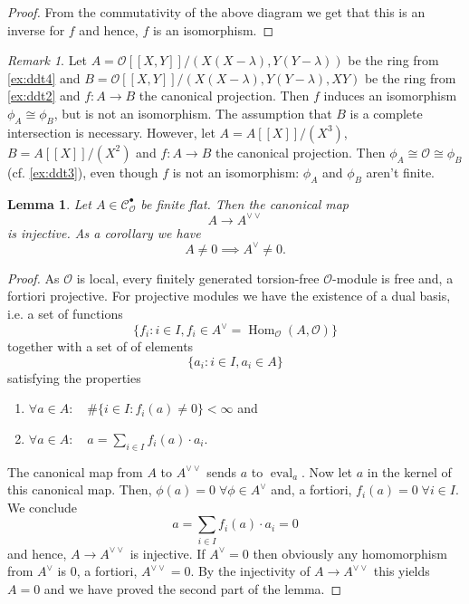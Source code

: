 \documentclass{article}
\theoremstyle{plain}%
\newtheorem{lemma}[theorem]{Lemma}
\theoremstyle{definition}
\theoremstyle{remark}
\newtheorem{remark}[theorem]{Remark}
\newcommand{\cob}{\mathcal{C}_\mathcal{O}^\bullet}
\renewcommand{\hom}{\operatorname{Hom}}
\begin{document}
\begin{proof}
    From the commutativity of the above diagram we get that this is an inverse for \(f\) and
    hence, \(f\) is an isomorphism.
\end{proof}

\begin{remark}\cite[remark 5.22, remark 5.23]{Darmon1995}
    Let \(A = \mathcal{O}[[X,Y]]/(X(X-\lambda), Y(Y-\lambda))\) be the ring from \cref{ex:ddt4} and 
    \(B = \mathcal{O}[[X,Y]]/(X(X-\lambda), Y(Y-\lambda), XY)\) be the ring from \cref{ex:ddt2} and 
    \(f\colon A \to B\) the canonical projection. Then \(f\) induces an isomorphism \(\phi_A \cong \phi_B\),
    but is not an isomorphism. The assumption that \(B\) is a complete intersection is necessary.
    However, let \(A = A[[X]]/(X^3)\), \(B = A[[X]]/(X^2)\) and \(f \colon A \to B\) the canonical projection.
    Then \(\phi_A \cong \mathcal{O} \cong \phi_B\) (cf. \cref{ex:ddt3}), even though \(f\) is not an isomorphism:
    \(\phi_A\) and \(\phi_B\) aren't finite.
\end{remark}

\begin{lemma}\label{lem:pontryagininjectivity}
    Let \(A \in \cob\) be finite flat. Then the canonical map
    \[
        A \to A^{\vee\vee}
    \]
    is injective. As a corollary we have
    \[
        A \neq 0 \implies A^\vee \neq 0.  
    \]
\end{lemma}
\begin{proof}
    As \(\mathcal{O}\) is local, every finitely generated torsion-free \(\mathcal{O}\)-module is free and, 
    a fortiori projective. For projective modules we have the existence of a dual basis, i.e. a set of functions
    \[
        \{f_i \colon i \in I, f_i \in A^\vee = \hom_\mathcal{O}(A, \mathcal{O})\}  
    \]
    together with a set of of elements
    \[
        \{a_i \colon i \in I, a_i \in A\}  
    \]
    satisfying the properties
    \begin{enumerate}
        \item \(\forall a \in A\colon \quad \# \{i\in I\colon f_i(a) \neq 0\} < \infty\) and
        \item \(\forall a \in A\colon \quad a = \sum_{i \in I} f_i(a)\cdot a_i\).
    \end{enumerate}
    The canonical map from \(A\) to \(A^{\vee\vee}\) sends \(a\) to \(\operatorname{eval}_a\).
    Now let \(a\) in the kernel of this canonical map. Then, \(\phi(a) = 0\; \forall \phi \in A^\vee\)
    and, a fortiori, \(f_i(a) = 0\; \forall i \in I\).
    We conclude
    \[
        a = \sum_{i \in I} f_i(a)\cdot a_i = 0
    \]
    and hence, \(A \to A^{\vee\vee}\) is injective. If \(A^\vee = 0\) then obviously any homomorphism from \(A^\vee\)
    is \(0\), a fortiori, \(A^{\vee\vee} = 0\). By the injectivity of \(A \to A^{\vee\vee}\) this yields \(A = 0\)
    and we have proved the second part of the lemma.    
\end{proof}
\end{document}

